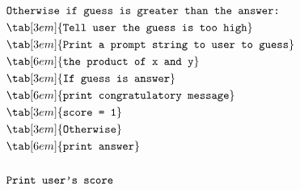 \begin{align*}
&\texttt{Otherwise if guess is greater than the answer:}\\
&\tab[3em]{\texttt{Tell user the guess is too high}}\\
&\tab[3em]{\texttt{Print a prompt string to user to guess}}\\
&\tab[6em]{\texttt{the product of x and y}}\\
&\tab[3em]{\texttt{If guess is answer}}\\
&\tab[6em]{\texttt{print congratulatory message}}\\
&\tab[3em]{\texttt{score = 1}}\\
&\tab[3em]{\texttt{Otherwise}}\\
&\tab[6em]{\texttt{print answer}}\\\\
&\texttt{Print user's score}\\
\end{align*}

